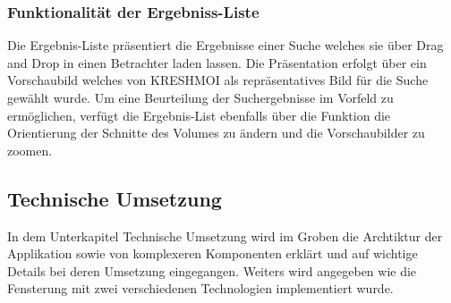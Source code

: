 \subsubsection{Funktionalität der Ergebniss-Liste}
\label{sec:Funktionalität der Ergebniss-Liste}
Die Ergebnis-Liste präsentiert die Ergebnisse einer Suche welches sie über Drag and Drop in einen Betrachter laden lassen.
Die Präsentation erfolgt über ein Vorschaubild welches von KRESHMOI als repräsentatives Bild für die Suche gewählt wurde.
Um eine Beurteilung der Suchergebnisse im Vorfeld zu ermöglichen, verfügt die Ergebnis-List ebenfalls über die Funktion die Orientierung der Schnitte des Volumes zu ändern und die Vorschaubilder zu zoomen.

\subsection{Technische Umsetzung}
\label{sec:Technische Umsetzung}
In dem Unterkapitel Technische Umsetzung wird im Groben die Archtiktur der Applikation sowie von komplexeren Komponenten erklärt und auf wichtige Details bei deren Umsetzung eingegangen.
Weiters wird angegeben wie die Fensterung mit zwei verschiedenen Technologien implementiert wurde.

